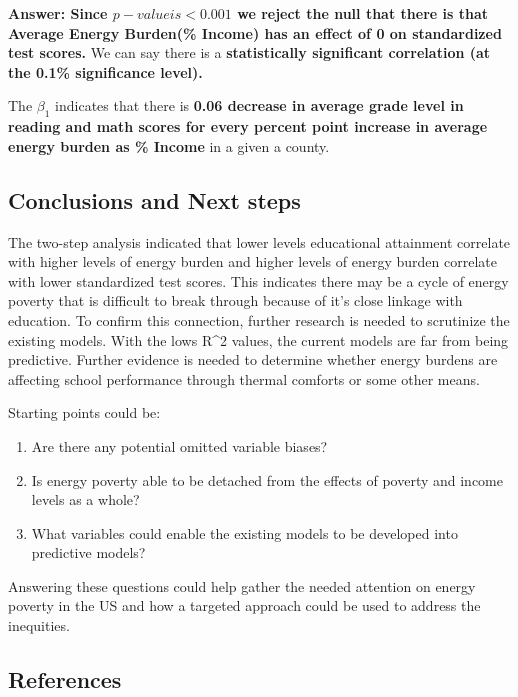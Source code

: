 \documentclass[
]{article}
\begin{document}
\textbf{Answer: Since \(p-value is < 0.001\) we reject the null that
there is that Average Energy Burden(\% Income) has an effect of 0 on
standardized test scores.} We can say there is a \textbf{statistically
significant correlation (at the 0.1\% significance level).}

The \(\beta_1\) indicates that there is \textbf{0.06 decrease in average
grade level in reading and math scores for every percent point increase
in average energy burden as \% Income} in a given a county.

\hypertarget{conclusions-and-next-steps}{%
\subsection{Conclusions and Next
steps}\label{conclusions-and-next-steps}}

The two-step analysis indicated that lower levels educational attainment
correlate with higher levels of energy burden and higher levels of
energy burden correlate with lower standardized test scores. This
indicates there may be a cycle of energy poverty that is difficult to
break through because of it's close linkage with education. To confirm
this connection, further research is needed to scrutinize the existing
models. With the lows R\^{}2 values, the current models are far from
being predictive. Further evidence is needed to determine whether energy
burdens are affecting school performance through thermal comforts or
some other means.

Starting points could be:

\begin{enumerate}
\def\labelenumi{\arabic{enumi}.}
\item
  Are there any potential omitted variable biases?
\item
  Is energy poverty able to be detached from the effects of poverty and
  income levels as a whole?
\item
  What variables could enable the existing models to be developed into
  predictive models?
\end{enumerate}

Answering these questions could help gather the needed attention on
energy poverty in the US and how a targeted approach could be used to
address the inequities.

\hypertarget{references}{%
\subsection{References}\label{references}}
\end{document}
